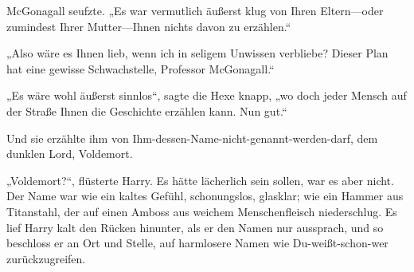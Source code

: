 McGonagall seufzte.
„Es war vermutlich äußerst klug von Ihren Eltern—oder zumindest Ihrer Mutter—Ihnen nichts davon zu erzählen.“

„Also wäre es Ihnen lieb, wenn ich in seligem Unwissen verbliebe? Dieser Plan hat eine gewisse Schwachstelle, Professor McGonagall.“

„Es wäre wohl äußerst sinnlos“, sagte die Hexe knapp, „wo doch jeder Mensch auf der Straße Ihnen die Geschichte erzählen kann. Nun gut.“

Und sie erzählte ihm von Ihm-dessen-Name-nicht-genannt-werden-darf, dem dunklen Lord, Voldemort.

„Voldemort?“, flüsterte Harry. Es hätte lächerlich sein sollen, war es aber nicht. Der Name war wie ein kaltes Gefühl, schonungslos, glasklar; wie ein Hammer aus Titanstahl, der auf einen Amboss aus weichem Menschenfleisch niederschlug. Es lief Harry kalt den Rücken hinunter, als er den Namen nur aussprach, und so beschloss er an Ort und Stelle, auf harmlosere Namen wie Du-weißt-schon-wer zurückzugreifen.

